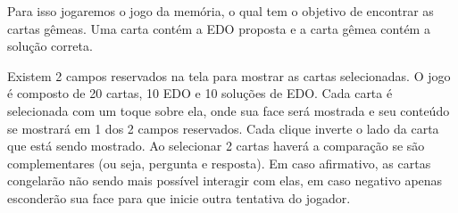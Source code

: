 Para isso jogaremos o jogo da memória, o qual tem o objetivo de encontrar as cartas gêmeas. Uma carta contém a EDO proposta e a carta gêmea contém a solução correta.

Existem 2 campos reservados na tela para mostrar as cartas selecionadas. O jogo é composto de 20 cartas, 10 EDO e 10 soluções de EDO. Cada carta é selecionada com um toque sobre ela, onde sua face será mostrada e seu conteúdo se mostrará em 1 dos 2 campos reservados. Cada clique inverte o lado da carta que está sendo mostrado. Ao selecionar 2 cartas haverá a comparação se são complementares (ou seja, pergunta e resposta). Em caso afirmativo, as cartas congelarão não sendo mais possível interagir com elas, em caso negativo apenas esconderão sua face para que inicie outra tentativa do jogador.

